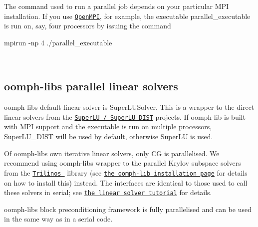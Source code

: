 \begin{DoxyItemize}
\item The command used to run a parallel job depends on your particular M\+PI installation. If you use \href{http://www.open-mpi.org/}{\tt Open\+M\+PI}, for example, the executable {\ttfamily parallel\+\_\+executable} is run on, say, four processors by issuing the command ~\newline
~\newline

\begin{DoxyCode}
mpirun -np 4 ./parallel\_executable
\end{DoxyCode}
 ~\newline

\end{DoxyItemize}



\hypertarget{index_solvers}{}\subsection{oomph-\/lib\textquotesingle{}s parallel linear solvers}\label{index_solvers}

\begin{DoxyItemize}
\item {\ttfamily oomph-\/lib\textquotesingle{}s} default linear solver is {\ttfamily Super\+L\+U\+Solver}. This is a wrapper to the direct linear solvers from the \href{http://crd.lbl.gov/~xiaoye/SuperLU}{\tt Super\+LU / Super\+L\+U\+\_\+\+D\+I\+ST} projects. If {\ttfamily oomph-\/lib} is built with M\+PI support and the executable is run on multiple processors, {\ttfamily Super\+L\+U\+\_\+\+D\+I\+ST} will be used by default, otherwise {\ttfamily Super\+LU} is used. ~\newline
~\newline

\item Of {\ttfamily oomph-\/lib\textquotesingle{}s} own iterative linear solvers, only {\ttfamily CG} is parallelised. We recommend using {\ttfamily oomph-\/lib\textquotesingle{}s} wrapper to the parallel Krylov subspace solvers from the \href{http://trilinos.sandia.gov/}{\tt Trilinos } library (see \href{../../../the_distribution/html/index.html#external_dist}{\tt the {\ttfamily oomph-\/lib} installation page} for details on how to install this) instead. The interfaces are identical to those used to call these solvers in serial; see \href{../../../linear_solvers/html/index.html}{\tt the linear solver tutorial} for details. ~\newline
~\newline

\item {\ttfamily oomph-\/lib\textquotesingle{}s} block preconditioning framework is fully parallelised and can be used in the same way as in a serial code.
\end{DoxyItemize}




